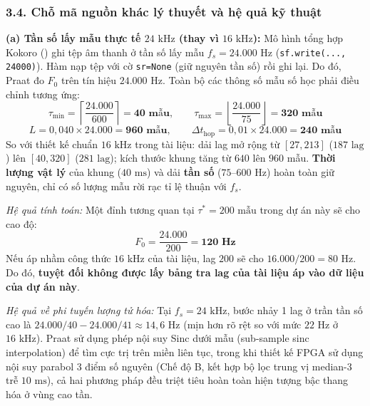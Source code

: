\documentclass[11pt,a4paper]{article}
\begin{document}
\subsubsection*{3.4. Chỗ mã nguồn khác lý thuyết và hệ quả kỹ thuật}

\textbf{(a) Tần số lấy mẫu thực tế $24\text{ kHz}$ (thay vì $16\text{ kHz}$):}
Mô hình tổng hợp Kokoro () ghi tệp âm thanh ở tần số lấy mẫu $f_s = 24.000\text{ Hz}$ (\texttt{sf.write(..., 24000)}). Hàm  nạp tệp với cờ \texttt{sr=None} (giữ nguyên tần số) rồi ghi lại. Do đó, Praat đo $F_0$ trên tín hiệu $24.000\text{ Hz}$. Toàn bộ các thông số mẫu số học phải điều chỉnh tương ứng:
\begin{equation}
\tau_{\min} = \left\lceil \frac{24.000}{600} \right\rceil = \mathbf{40\text{ mẫu}}, \qquad \tau_{\max} = \left\lfloor \frac{24.000}{75} \right\rfloor = \mathbf{320\text{ mẫu}}
\end{equation}
\begin{equation}
L = 0{,}040 \times 24.000 = \mathbf{960\text{ mẫu}}, \qquad \Delta t_{\text{hop}} = 0{,}01 \times 24.000 = \mathbf{240\text{ mẫu}}
\end{equation}
So với thiết kế chuẩn $16\text{ kHz}$ trong tài liệu: dải lag mở rộng từ $[27, 213]$ ($187\text{ lag}$) lên $[40, 320]$ ($281\text{ lag}$); kích thước khung tăng từ $640$ lên $960$ mẫu. \textbf{Thời lượng vật lý} của khung ($40\text{ ms}$) và dải \textbf{tần số} ($75\text{--}600\text{ Hz}$) hoàn toàn giữ nguyên, chỉ có số lượng mẫu rời rạc tỉ lệ thuận với $f_s$.

\textit{Hệ quả tính toán:} Một đỉnh tương quan tại $\tau^* = 200\text{ mẫu}$ trong dự án này sẽ cho cao độ:
\[
F_0 = \frac{24.000}{200} = \mathbf{120\text{ Hz}}
\]
Nếu áp nhầm công thức $16\text{ kHz}$ của tài liệu, lag $200$ sẽ cho $16.000 / 200 = 80\text{ Hz}$. Do đó, \textbf{tuyệt đối không được lấy bảng tra lag của tài liệu áp vào dữ liệu của dự án này}.

\textit{Hệ quả về phi tuyến lượng tử hóa:} Tại $f_s = 24\text{ kHz}$, bước nhảy 1 lag ở trần tần số cao là $24.000/40 - 24.000/41 \approx 14{,}6\text{ Hz}$ (mịn hơn rõ rệt so với mức $22\text{ Hz}$ ở $16\text{ kHz}$). Praat sử dụng phép nội suy Sinc dưới mẫu (sub-sample sinc interpolation) để tìm cực trị trên miền liên tục, trong khi thiết kế FPGA sử dụng nội suy parabol 3 điểm số nguyên (Chế độ B, kết hợp bộ lọc trung vị median-3 trễ $10\text{ ms}$), cả hai phương pháp đều triệt tiêu hoàn toàn hiện tượng bậc thang hóa ở vùng cao tần.
\end{document}
